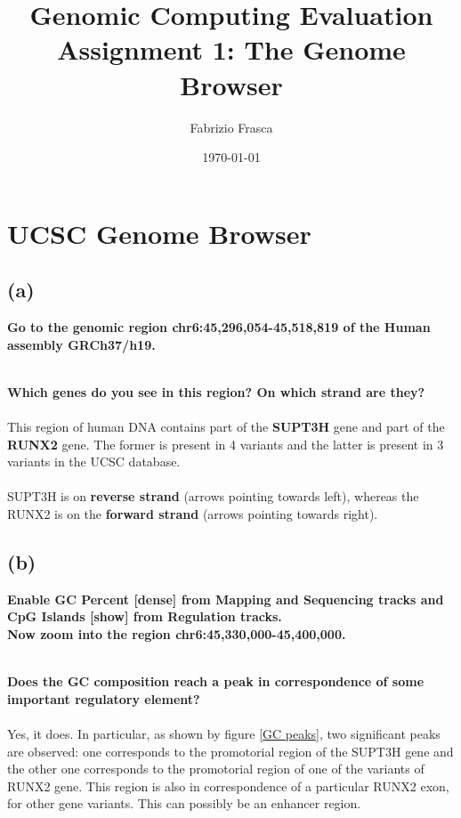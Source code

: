\documentclass[12pt, a4paper]{article}
\title{\textbf{Genomic Computing Evaluation}\\Assignment 1: The Genome Browser}
\author{Fabrizio Frasca}
\date{\today}
\begin{document}
	
\maketitle
\clearpage

\section{UCSC Genome Browser}

\subsection*{(a)}

\textbf{Go to the genomic region chr6:45,296,054-45,518,819 of the Human assembly GRCh37/h19.}%

\textbf{\\ Which genes do you see in this region? On which strand are they?}%
\paragraph{} This region of human DNA contains part of the \textbf{SUPT3H} gene and part of the \textbf{RUNX2} gene. The former is present in 4 variants and the latter is present in 3 variants in the UCSC database.%
\paragraph{} SUPT3H is on \textbf{reverse strand} (arrows pointing towards left), whereas the RUNX2 is on the \textbf{forward strand} (arrows pointing towards right).	

\subsection*{(b)}

\textbf{Enable GC Percent [dense] from Mapping and Sequencing tracks and CpG Islands [show] from Regulation tracks.\\ Now zoom into the region chr6:45,330,000-45,400,000.}%

\textbf{\\ Does the GC composition reach a peak in correspondence of some important regulatory element?}%
\paragraph{}Yes, it does. In particular, as shown by figure \ref{GC peaks}, two significant peaks are observed: one corresponds to the promotorial region of the SUPT3H gene and the other one corresponds to the promotorial region of one of the variants of RUNX2 gene. This region is also in correspondence of a particular RUNX2 exon, for other gene variants. This can possibly be an enhancer region.
\end{document}
